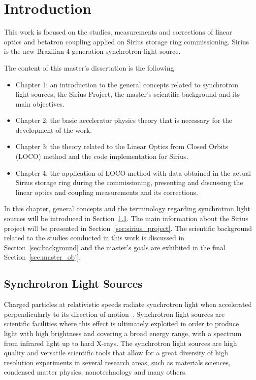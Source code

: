 \chapter{Introduction} \label{chap:intro}
This work is focused on the studies, measurements and corrections of linear optics and betatron coupling applied on Sirius storage ring commissioning. Sirius is the new Brazilian 4 generation synchrotron light source. 

The content of this master's dissertation is the following:
\begin{itemize}
    \item Chapter 1: an introduction to the general concepts related to synchrotron light sources, the Sirius Project, the master's scientific background and its main objectives.
    \item Chapter 2: the basic accelerator physics theory that is necessary for the development of the work.
    \item Chapter 3: the theory related to the Linear Optics from Closed Orbits (LOCO) method and the code implementation for Sirius.
    \item Chapter 4: the application of LOCO method with data obtained in the actual Sirius storage ring during the commissioning, presenting and discussing the linear optics and coupling measurements and its corrections.
\end{itemize}

In this chapter, general concepts and the terminology regarding synchrotron light sources will be introduced in Section~\ref{sec:sls}. The main information about the Sirius project will be presented in Section~\ref{sec:sirius_project}. The scientific background related to the studies conducted in this work is discussed in Section~\ref{sec:background} and the master's goals are exhibited in the final Section~\ref{sec:master_obj}.
\section{Synchrotron Light Sources}\label{sec:sls}
Charged particles at relativistic speeds radiate synchrotron light when accelerated perpendicularly to its direction of motion~\cite{jackson}. Synchrotron light sources are scientific facilities where this effect is ultimately exploited in order to produce light with high brightness and covering a broad energy range, with a spectrum from infrared light up to hard X-rays. The synchrotron light sources are high quality and versatile scientific tools that allow for a great diversity of high resolution experiments in several research areas, such as materials sciences, condensed matter physics, nanotechnology and many others.

